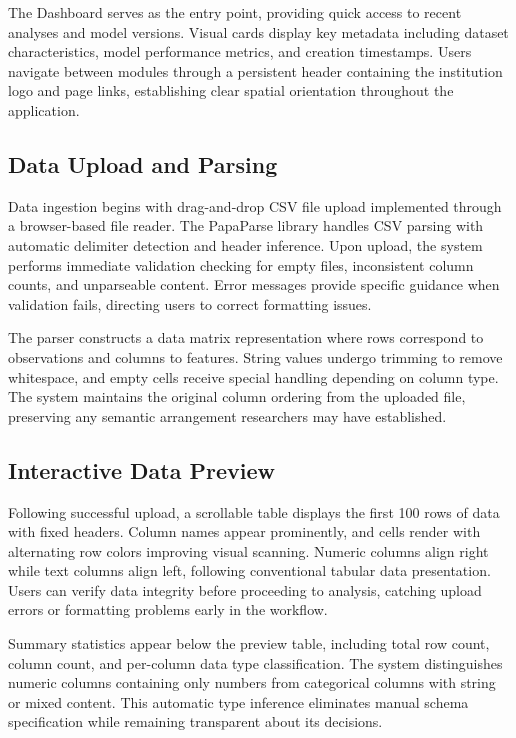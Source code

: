 \documentclass[conference]{IEEEtran}
\begin{document}
The Dashboard serves as the entry point, providing quick access to recent analyses and model versions. Visual cards display key metadata including dataset characteristics, model performance metrics, and creation timestamps. Users navigate between modules through a persistent header containing the institution logo and page links, establishing clear spatial orientation throughout the application.

\subsection{Data Upload and Parsing}

Data ingestion begins with drag-and-drop CSV file upload implemented through a browser-based file reader. The PapaParse library handles CSV parsing with automatic delimiter detection and header inference. Upon upload, the system performs immediate validation checking for empty files, inconsistent column counts, and unparseable content. Error messages provide specific guidance when validation fails, directing users to correct formatting issues.

The parser constructs a data matrix representation where rows correspond to observations and columns to features. String values undergo trimming to remove whitespace, and empty cells receive special handling depending on column type. The system maintains the original column ordering from the uploaded file, preserving any semantic arrangement researchers may have established.

\subsection{Interactive Data Preview}

Following successful upload, a scrollable table displays the first 100 rows of data with fixed headers. Column names appear prominently, and cells render with alternating row colors improving visual scanning. Numeric columns align right while text columns align left, following conventional tabular data presentation. Users can verify data integrity before proceeding to analysis, catching upload errors or formatting problems early in the workflow.

Summary statistics appear below the preview table, including total row count, column count, and per-column data type classification. The system distinguishes numeric columns containing only numbers from categorical columns with string or mixed content. This automatic type inference eliminates manual schema specification while remaining transparent about its decisions.
\end{document}
